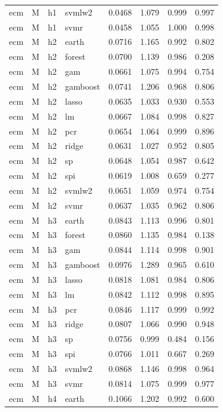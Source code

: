 \begin{ThreePartTable}
\begin{longtable}[t]{llclcccc}
ecm & M & h1 & svmlw2 & 0.0468 & 1.079 & 0.999 & 0.997\\
ecm & M & h1 & svmr & 0.0458 & 1.055 & 1.000 & 0.998\\
\addlinespace
ecm & M & h2 & earth & 0.0716 & 1.165 & 0.992 & 0.802\\
ecm & M & h2 & forest & 0.0700 & 1.139 & 0.986 & 0.208\\
ecm & M & h2 & gam & 0.0661 & 1.075 & 0.994 & 0.754\\
ecm & M & h2 & gamboost & 0.0741 & 1.206 & 0.968 & 0.806\\
ecm & M & h2 & lasso & 0.0635 & 1.033 & 0.930 & 0.553\\
ecm & M & h2 & lm & 0.0667 & 1.084 & 0.998 & 0.827\\
ecm & M & h2 & pcr & 0.0654 & 1.064 & 0.999 & 0.896\\
ecm & M & h2 & ridge & 0.0631 & 1.027 & 0.952 & 0.805\\
ecm & M & h2 & sp & 0.0648 & 1.054 & 0.987 & 0.642\\
ecm & M & h2 & spi & 0.0619 & 1.008 & 0.659 & 0.277\\
ecm & M & h2 & svmlw2 & 0.0651 & 1.059 & 0.974 & 0.754\\
ecm & M & h2 & svmr & 0.0637 & 1.035 & 0.962 & 0.806\\
\addlinespace
ecm & M & h3 & earth & 0.0843 & 1.113 & 0.996 & 0.801\\
ecm & M & h3 & forest & 0.0860 & 1.135 & 0.984 & 0.138\\
ecm & M & h3 & gam & 0.0844 & 1.114 & 0.998 & 0.901\\
ecm & M & h3 & gamboost & 0.0976 & 1.289 & 0.965 & 0.610\\
ecm & M & h3 & lasso & 0.0818 & 1.081 & 0.984 & 0.806\\
ecm & M & h3 & lm & 0.0842 & 1.112 & 0.998 & 0.895\\
ecm & M & h3 & pcr & 0.0846 & 1.117 & 0.999 & 0.992\\
ecm & M & h3 & ridge & 0.0807 & 1.066 & 0.990 & 0.948\\
ecm & M & h3 & sp & 0.0756 & 0.999 & 0.484 & 0.156\\
ecm & M & h3 & spi & 0.0766 & 1.011 & 0.667 & 0.269\\
ecm & M & h3 & svmlw2 & 0.0868 & 1.146 & 0.998 & 0.964\\
ecm & M & h3 & svmr & 0.0814 & 1.075 & 0.999 & 0.977\\
\addlinespace
ecm & M & h4 & earth & 0.1066 & 1.202 & 0.992 & 0.600\\

\end{longtable}
\end{ThreePartTable}
